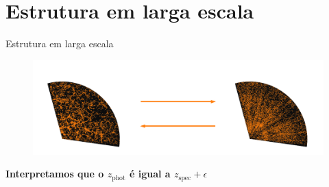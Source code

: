 \section{Estrutura em larga escala}
\begin{frame}[c]{Estrutura em larga escala}
    \begin{figure}
        \centering
        \includegraphics[width=\linewidth]{script/images/lss_problem.pdf}
    \end{figure}
    \centering
    \begin{tcolorbox}[hbox] %
        \textbf{Interpretamos que o $z_\text{phot}$ é igual a $z_\text{spec} + \epsilon$}
    \end{tcolorbox}
\end{frame}




